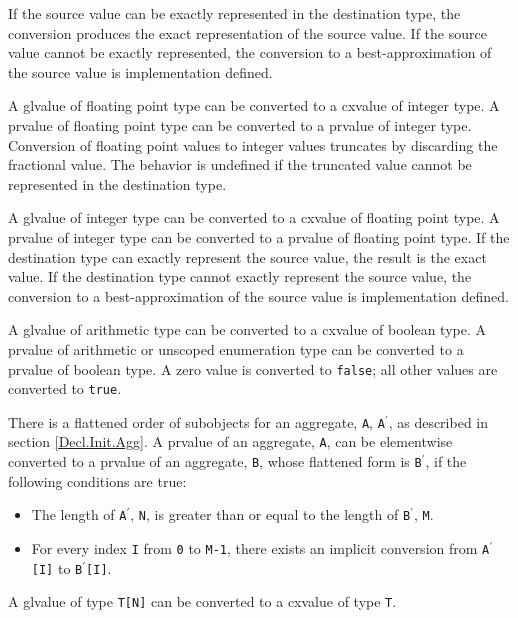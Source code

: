 \p If the source value can be exactly represented in the destination type, the
conversion produces the exact representation of the source value. If the source
value cannot be exactly represented, the conversion to a best-approximation of
the source value is implementation defined.


\p A glvalue of floating point type can be converted to a cxvalue of integer
type. A prvalue of floating point type can be converted to a prvalue of
integer type. Conversion of floating point values to integer values truncates by
discarding the fractional value. The behavior is undefined if the truncated
value cannot be represented in the destination type.

\p A glvalue of integer type can be converted to a cxvalue of floating point
type. A prvalue of integer type can be converted to a prvalue of floating
point type. If the destination type can exactly represent the source value, the
result is the exact value. If the destination type cannot exactly represent the
source value, the conversion to a best-approximation of the source value is
implementation defined.


\p A glvalue of arithmetic type can be converted to a cxvalue of boolean type. A
prvalue of arithmetic or unscoped enumeration type can be converted to a prvalue
of boolean type. A zero value is converted to \texttt{false}; all other values
are converted to \texttt{true}.


\p There is a flattened order of subobjects for an aggregate, \texttt{A},
\texttt{A$^\prime$}, as described in section \ref{Decl.Init.Agg}.  A prvalue of an aggregate,
\texttt{A}, can be elementwise converted to a prvalue of an aggregate, \texttt{B}, whose flattened
form is \texttt{B$^\prime$}, if the following conditions are true: 
\begin{itemize}
\item The length of \texttt{A$^\prime$}, \texttt{N}, is greater than or equal to the
length of \texttt{B$^\prime$}, \texttt{M}.
\item For every index \texttt{I} from \texttt{0} to \texttt{M-1}, there exists an
implicit conversion from \texttt{A$^\prime$[I]} to \texttt{B$^\prime$[I]}.
\end{itemize}

\p A glvalue of type \texttt{T[N]} can be converted to a cxvalue of type \texttt{T}.

